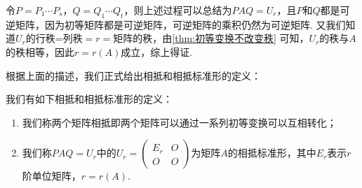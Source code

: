 令$P=P_1\cdots P_s$，$Q=Q_1\cdots Q_t$，则上述过程可以总结为$PAQ=U_r$，且$P$和$Q$都是可逆矩阵，因为初等矩阵都是可逆矩阵，可逆矩阵的乘积仍然为可逆矩阵. 又我们知道$U_r$的行秩=列秩$=r=$矩阵的秩，由\autoref{thm:初等变换不改变秩} 可知，$U_r$的秩与$A$的秩相等，因此$r=r(A)$成立，综上得证.

根据上面的描述，我们正式给出相抵和相抵标准形的定义：
\begin{definition}{}{}
    我们有如下相抵和相抵标准形的定义：
    \begin{enumerate}
        \item 我们称两个矩阵相抵即两个矩阵可以通过一系列初等变换可以互相转化；

        \item 我们称$PAQ=U_r$中的$U_r=\begin{pmatrix}
                      E_r & O \\ O & O
                  \end{pmatrix}$为矩阵$A$的相抵标准形，其中$E_r$表示$r$阶单位矩阵，$r=r(A)$.
    \end{enumerate}
\end{definition}

